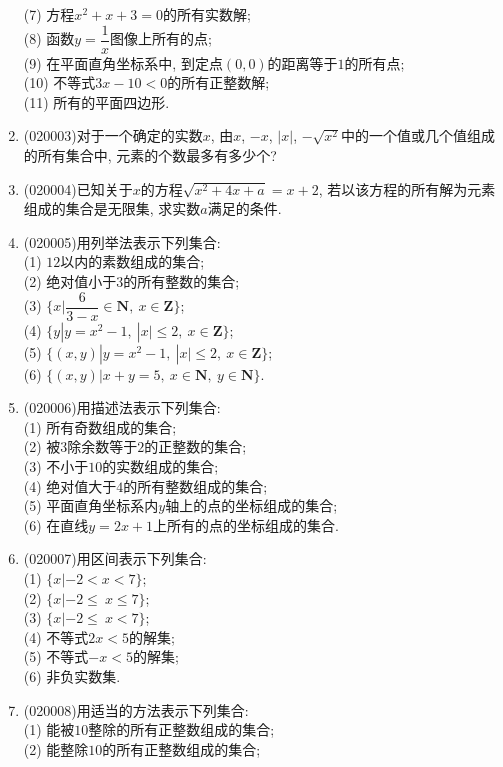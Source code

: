 \documentclass[10pt,a4paper]{article}
\begin{document}
\begin{enumerate}[1.]
(7) 方程$x^2+x+3=0$的所有实数解;\\ 
(8) 函数$y=\dfrac 1x$图像上所有的点;\\ 
(9) 在平面直角坐标系中, 到定点$(0, 0)$的距离等于$1$的所有点;\\
(10) 不等式$3x-10<0$的所有正整数解;\\
(11) 所有的平面四边形.
\item {\tiny (020003)}对于一个确定的实数$x$, 由$x$, $-x$, $|x|$, $-\sqrt{x^2}$中的一个值或几个值组成的所有集合中, 元素的个数最多有多少个?
\item {\tiny (020004)}已知关于$x$的方程$\sqrt {x^2+4x+a}=x+2$, 若以该方程的所有解为元素组成的集合是无限集, 求实数$a$满足的条件.
\item {\tiny (020005)}用列举法表示下列集合:\\
(1) $12$以内的素数组成的集合;\\
(2) 绝对值小于$3$的所有整数的集合;\\
(3) $\{x|\dfrac 6{3-x}\in\mathbf{N}, \ x\in\mathbf{Z}\}$;\\
(4) $\{y|y=x^2-1 , \ |x| \le 2, \ x\in\mathbf{Z}\}$;\\
(5) $\{( x,y)|y=x^2-1,\ |x|\le 2, \ x\in\mathbf{Z}\}$;\\
(6) $\{( x,y)|x +y=5, \ x\in\mathbf{N}, \ y\in\mathbf{N}\}$.
\item {\tiny (020006)}用描述法表示下列集合:\\
(1) 所有奇数组成的集合;\\
(2) 被$3$除余数等于$2$的正整数的集合;\\
(3) 不小于$10$的实数组成的集合;\\
(4) 绝对值大于$4$的所有整数组成的集合;\\
(5) 平面直角坐标系内$y$轴上的点的坐标组成的集合;\\
(6) 在直线$y=2x+1$上所有的点的坐标组成的集合.
\item {\tiny (020007)}用区间表示下列集合:\\
(1) $\{x|-2<x<7\}$;\\
(2) $\{x|-2\le\ x\le7\}$;\\
(3) $\{x|-2\le\ x<7\}$;\\
(4) 不等式$2x<5$的解集;\\
(5) 不等式$-x<5$的解集; \\
(6) 非负实数集.
\item {\tiny (020008)}用适当的方法表示下列集合:\\
(1) 能被$10$整除的所有正整数组成的集合;\\
(2) 能整除$10$的所有正整数组成的集合;\\

\end{enumerate}
\end{document}
